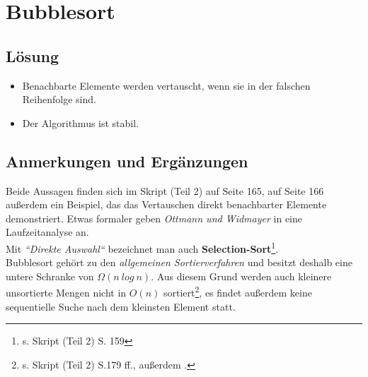 \chapter{Bubblesort}

\section*{Lösung}

\begin{itemize}
    \item Benachbarte Elemente werden vertauscht, wenn sie in der falschen Reihenfolge sind.
    \item Der Algorithmus ist stabil.
\end{itemize}



\section*{Anmerkungen und Ergänzungen}

Beide Aussagen finden sich im Skript (Teil 2) auf Seite 165, auf Seite 166 außerdem ein Beispiel, das das Vertauschen direkt benachbarter Elemente demonstriert.
Etwas formaler geben \textit{Ottmann und Widmayer} in \cite[89 ff.]{OW17b} eine Laufzeitanalyse an.
\\

Mit \textit{``Direkte Auswahl``} bezeichnet man auch \textbf{Selection-Sort}\footnote{ s. Skript (Teil 2) S. 159}.
\\

Bubblesort gehört zu den \textit{allgemeinen Sortierverfahren} und besitzt deshalb eine untere Schranke von $\Omega(n\ log\ n)$.
Aus diesem Grund werden auch kleinere unsortierte Mengen nicht in $O(n)$ sortiert\footnote{
s. Skript (Teil 2) S.179 ff., außerdem \cite[153 ff.]{OW17b}.
}, es findet außerdem keine sequentielle Suche nach dem kleinsten Element statt.

